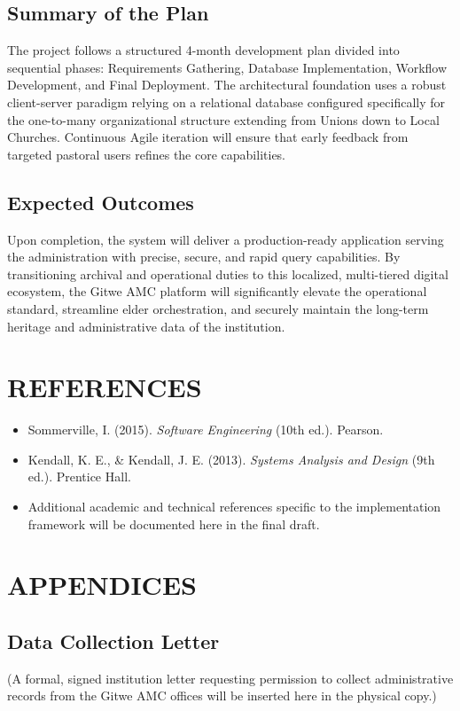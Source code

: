 \documentclass[12pt]{report}
\begin{document}
\section{Summary of the Plan}
The project follows a structured 4-month development plan divided into sequential phases: Requirements Gathering, Database Implementation, Workflow Development, and Final Deployment. The architectural foundation uses a robust client-server paradigm relying on a relational database configured specifically for the one-to-many organizational structure extending from Unions down to Local Churches. Continuous Agile iteration will ensure that early feedback from targeted pastoral users refines the core capabilities.

\section{Expected Outcomes}
Upon completion, the system will deliver a production-ready application serving the administration with precise, secure, and rapid query capabilities. By transitioning archival and operational duties to this localized, multi-tiered digital ecosystem, the Gitwe AMC platform will significantly elevate the operational standard, streamline elder orchestration, and securely maintain the long-term heritage and administrative data of the institution.

\chapter{REFERENCES}
\begin{itemize}
    \item Sommerville, I. (2015). \textit{Software Engineering} (10th ed.). Pearson.
    \item Kendall, K. E., \& Kendall, J. E. (2013). \textit{Systems Analysis and Design} (9th ed.). Prentice Hall.
    \item Additional academic and technical references specific to the implementation framework will be documented here in the final draft.
\end{itemize}

\chapter*{APPENDICES}

\section*{Data Collection Letter}
(A formal, signed institution letter requesting permission to collect administrative records from the Gitwe AMC offices will be inserted here in the physical copy.)
\end{document}
